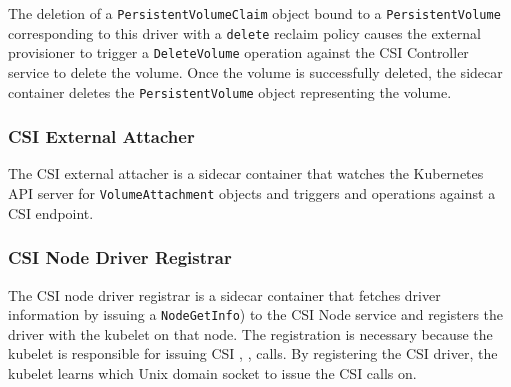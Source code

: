 The deletion of a \texttt{PersistentVolumeClaim} object bound to a
\texttt{PersistentVolume} corresponding to this driver with a \texttt{delete}
reclaim policy causes the external provisioner to trigger a
\texttt{DeleteVolume} operation against the CSI Controller service to delete the
volume. Once the volume is successfully deleted, the sidecar container deletes
the \texttt{PersistentVolume} object representing the volume.

\subsubsection{CSI External Attacher}

The CSI external attacher is a sidecar container that watches the Kubernetes API
server for \texttt{VolumeAttachment} objects and triggers
 and  operations
against a CSI endpoint.


\subsubsection{CSI Node Driver Registrar}

The CSI node driver registrar is a sidecar container that fetches driver
information  by issuing a \texttt{NodeGetInfo}) to the CSI Node service and
registers the driver with the kubelet on that node.  The registration is
necessary because the kubelet is responsible for issuing CSI ,
,  calls. By registering the CSI
driver, the kubelet learns which Unix domain socket to issue the CSI calls on.